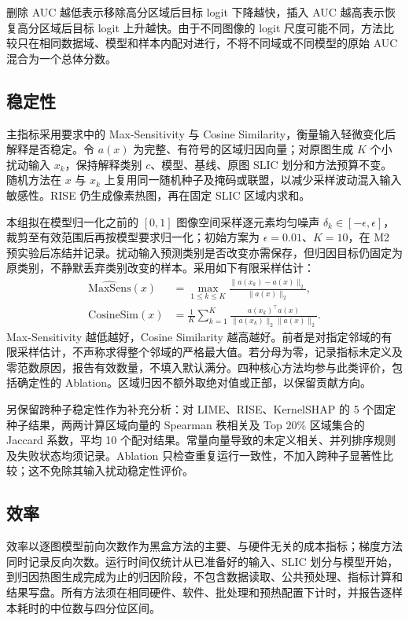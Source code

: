 删除 AUC 越低表示移除高分区域后目标 logit 下降越快，插入 AUC 越高表示恢复高分区域后目标 logit 上升越快。由于不同图像的 logit 尺度可能不同，方法比较只在相同数据域、模型和样本内配对进行，不将不同域或不同模型的原始 AUC 混合为一个总体分数。

\subsection{稳定性}

主指标采用要求中的 Max-Sensitivity 与 Cosine Similarity，衡量输入轻微变化后解释是否稳定。令 $a(x)$ 为完整、有符号的区域归因向量；对原图生成 $K$ 个小扰动输入 $x_k$，保持解释类别 $c$、模型、基线、原图 SLIC 划分和方法预算不变。随机方法在 $x$ 与 $x_k$ 上复用同一随机种子及掩码或联盟，以减少采样波动混入输入敏感性。RISE 仍生成像素热图，再在固定 SLIC 区域内求和。

本组拟在模型归一化之前的 $[0,1]$ 图像空间采样逐元素均匀噪声 $\delta_k\in[-\epsilon,\epsilon]$，裁剪至有效范围后再按模型要求归一化；初始方案为 $\epsilon=0.01$、$K=10$，在 M2 预实验后冻结并记录。扰动输入预测类别是否改变亦需保存，但归因目标仍固定为原类别，不静默丢弃类别改变的样本。采用如下有限采样估计：
\[
 \begin{aligned}
 \widehat{\mathrm{MaxSens}}(x)&=
 \max_{1\leq k\leq K}
 \frac{\|a(x_k)-a(x)\|_2}{\|a(x)\|_2},\\
 \mathrm{CosineSim}(x)&=
 \frac{1}{K}\sum_{k=1}^{K}
 \frac{a(x_k)^\top a(x)}{\|a(x_k)\|_2\|a(x)\|_2}.
 \end{aligned}
\]
Max-Sensitivity 越低越好，Cosine Similarity 越高越好。前者是对指定邻域的有限采样估计，不声称求得整个邻域的严格最大值。若分母为零，记录指标未定义及零范数原因，报告有效数量，不填入默认满分。四种核心方法均参与此类评价，包括确定性的 Ablation。区域归因不额外取绝对值或正部，以保留贡献方向。

另保留跨种子稳定性作为补充分析：对 LIME、RISE、KernelSHAP 的 5 个固定种子结果，两两计算区域向量的 Spearman 秩相关及 Top $20\%$ 区域集合的 Jaccard 系数，平均 10 个配对结果。常量向量导致的未定义相关、并列排序规则及失败状态均须记录。Ablation 只检查重复运行一致性，不加入跨种子显著性比较；这不免除其输入扰动稳定性评价。

\subsection{效率}

效率以逐图模型前向次数作为黑盒方法的主要、与硬件无关的成本指标；梯度方法同时记录反向次数。运行时间仅统计从已准备好的输入、SLIC 划分与模型开始，到归因热图生成完成为止的归因阶段，不包含数据读取、公共预处理、指标计算和结果写盘。所有方法须在相同硬件、软件、批处理和预热配置下计时，并报告逐样本耗时的中位数与四分位区间。

